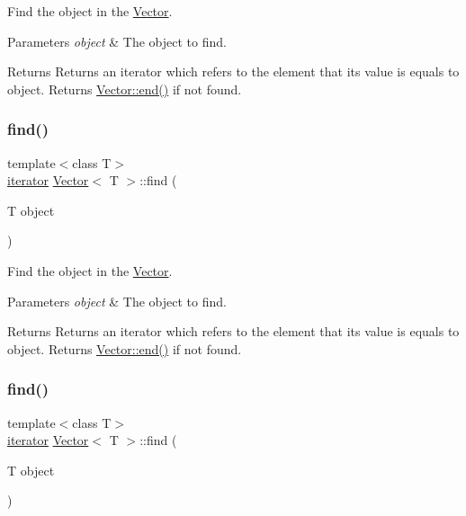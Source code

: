 Find the object in the \hyperlink{classVector}{Vector}. 


\begin{DoxyParams}{Parameters}
{\em object} & The object to find. \\
\hline
\end{DoxyParams}
\begin{DoxyReturn}{Returns}
Returns an iterator which refers to the element that its value is equals to object. Returns \hyperlink{classVector_ae288fa619188bff101d5300b8aaf9a90}{Vector\+::end()} if not found. 
\end{DoxyReturn}
\mbox{\label{classVector_a0cc9f44b2dfb2431e36479badc0f22ff}} 
\subsubsection{\texorpdfstring{find()}{find()}\hspace{0.1cm}{\footnotesize\ttfamily [3/4]}}
{\footnotesize\ttfamily template$<$class T$>$ \\
\hyperlink{classVector_a45531016f99e90887e0f890f2da943e4}{iterator} \hyperlink{classVector}{Vector}$<$ T $>$\+::find (\begin{DoxyParamCaption}\item[{T}]{object }\end{DoxyParamCaption})\hspace{0.3cm}{\ttfamily [inline]}}



Find the object in the \hyperlink{classVector}{Vector}. 


\begin{DoxyParams}{Parameters}
{\em object} & The object to find. \\
\hline
\end{DoxyParams}
\begin{DoxyReturn}{Returns}
Returns an iterator which refers to the element that its value is equals to object. Returns \hyperlink{classVector_ae288fa619188bff101d5300b8aaf9a90}{Vector\+::end()} if not found. 
\end{DoxyReturn}
\mbox{\label{classVector_a0cc9f44b2dfb2431e36479badc0f22ff}} 
\subsubsection{\texorpdfstring{find()}{find()}\hspace{0.1cm}{\footnotesize\ttfamily [4/4]}}
{\footnotesize\ttfamily template$<$class T$>$ \\
\hyperlink{classVector_a45531016f99e90887e0f890f2da943e4}{iterator} \hyperlink{classVector}{Vector}$<$ T $>$\+::find (\begin{DoxyParamCaption}\item[{T}]{object }\end{DoxyParamCaption})\hspace{0.3cm}{\ttfamily [inline]}}



